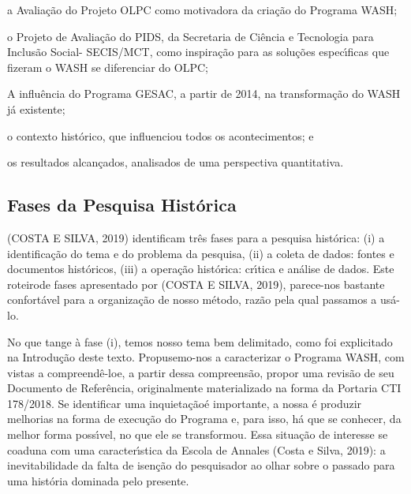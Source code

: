 \documentclass[
12pt,		%
openright,	%
twoside,  %
a4paper,			%
chapter=TITLE,		%
english,			%
french,				%
spanish,			%
brazil				%
]{USPSC-classe/USPSC}
\begin{document}
\begin{alineas}
\item a Avalia\c{c}\~ao do Projeto OLPC como motivadora da cria\c{c}\~ao do Programa WASH;
\item o Projeto de Avalia\c{c}\~ao do PIDS, da Secretaria de Ci\^encia e Tecnologia para Inclus\~ao Social- SECIS/MCT, como inspira\c{c}\~ao para as solu\c{c}\~oes espec\'{\i}ficas que fizeram o WASH se diferenciar do OLPC;
\item A influ\^encia do Programa GESAC, a partir de 2014, na transforma\c{c}\~ao do WASH j\'a existente;
\item o contexto hist\'orico, que influenciou todos os acontecimentos; e
\item os resultados alcan\c{c}ados, analisados de uma perspectiva quantitativa.
\end{alineas}

\subsection[Fases da Pesquisa Hist\'orica]{Fases da Pesquisa Hist\'orica}\label{Fases da Pesquisa Hist\'orica}
(COSTA E SILVA, 2019) identificam tr\^es fases para a pesquisa hist\'orica: (i) a identifica\c{c}\~ao do tema e do problema da pesquisa, (ii) a coleta de dados: fontes e documentos hist\'oricos, (iii) a opera\c{c}\~ao hist\'orica: cr\'{\i}tica e an\'alise de dados. Este \textquotedbl roteiro\textquotedbl  de fases apresentado por (COSTA E SILVA, 2019), parece-nos bastante confort\'avel para a organiza\c{c}\~ao de nosso m\'etodo, raz\~ao pela qual passamos a us\'a-lo.









No que tange \`a fase (i), temos nosso tema bem delimitado, como foi explicitado na Introdu\c{c}\~ao deste texto. Propusemo-nos a caracterizar o Programa WASH, com vistas a \textquotedbl compreend\^e-lo\textquotedbl  e, a partir dessa compreens\~ao, propor uma revis\~ao de seu Documento de Refer\^encia, originalmente materializado na forma da Portaria CTI 178/2018. Se \textquotedbl identificar uma inquieta\c{c}\~ao\textquotedbl  \'e importante, a nossa \'e produzir melhorias na forma de execu\c{c}\~ao do Programa e, para isso, h\'a que se conhecer, da melhor forma poss\'{\i}vel, no que ele se transformou. Essa situa\c{c}\~ao de \textquotedbl interesse \textquotedbl  se coaduna com uma caracter\'{\i}stica da Escola de Annales  (Costa e Silva, 2019): \textquotedbl a inevitabilidade da falta de isen\c{c}\~ao do pesquisador ao olhar sobre o passado para uma hist\'oria dominada pelo presente.\textquotedbl 
\end{document}
